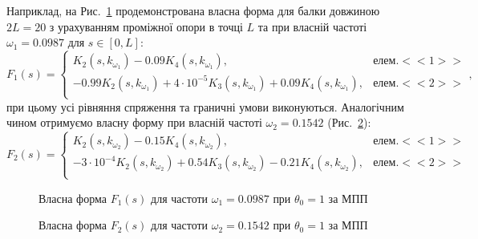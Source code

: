 \documentclass{mathreport}
\begin{document}
Наприклад, на Рис.~\ref{pic: TMM F1(s) eigenvector} продемонстрована власна форма для балки довжиною $2L=20$ з урахуванням проміжної опори в точці $L$ та при власній частоті $\omega_1 = 0.0987$ для $s \in [0,L]:$
\begin{equation}\label{eq: TMM F1(s) eigenvector}
    F_1(s) = 
    \begin{cases*}
        K_2(s,k_{\omega_1}) - 0.09 K_4(s,k_{\omega_1}), & елем. <<1>> \\
        -0.99 K_2(s,k_{\omega_1}) + 4\cdot 10^{-5} K_3(s,k_{\omega_1}) + 0.09 K_4(s,k_{\omega_1}), & елем. <<2>> \\
    \end{cases*}, 
\end{equation}
при цьому усі рівняння спряження та граничні умови виконуються. Аналогічним чином отримуємо власну форму при власній частоті $\omega_2 = 0.1542$ (Рис.~\ref{pic: TMM F2(s) eigenvector}):
\begin{equation}\label{eq: TMM F2(s) eigenvector}
    F_2(s) = 
    \begin{cases*}
        K_2(s,k_{\omega_2}) - 0.15 K_4(s,k_{\omega_2}), & елем. <<1>> \\
        -3\cdot 10^{-4} K_2(s,k_{\omega_2}) + 0.54 K_3(s,k_{\omega_2}) - 0.21 K_4(s,k_{\omega_2}), & елем. <<2>> \\
    \end{cases*}
\end{equation}

\vspace{0.4cm}
\begin{figure}[H]\centering
    \resizebox{\linewidth}{!}{}
    \caption{Власна форма $F_1(s)$ для частоти $\omega_1 = 0.0987$ при $\theta_0=1$ за МПП}
    \label{pic: TMM F1(s) eigenvector}
\end{figure}

\begin{figure}[H]\centering
    \resizebox{\linewidth}{!}{}
    \caption{Власна форма $F_2(s)$ для частоти $\omega_2 = 0.1542$ при $\theta_0=1$ за МПП}
    \label{pic: TMM F2(s) eigenvector}
\end{figure}
\end{document}
